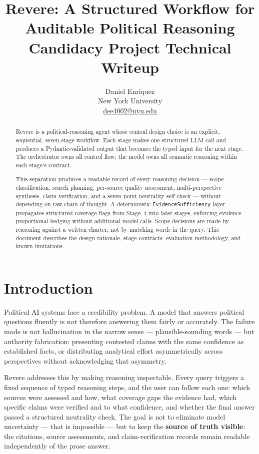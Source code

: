 \documentclass[11pt,letterpaper]{article}
\title{%
  \textbf{Revere: A Structured Workflow for\\[3pt]Auditable Political Reasoning}\\[8pt]
  \large Candidacy Project Technical Writeup
}
\author{Daniel Enriquez\\
  New York University\\
  \href{mailto:dee4002@nyu.edu}{dee4002@nyu.edu}}
\date{\provisional{Draft — June 2026. Candidacy Project Technical Writeup.}}
\newcommand{\kw}[1]{\textbf{#1}}
\newcommand{\code}[1]{\texttt{\small #1}}
\begin{document}
\maketitle

\begin{abstract}
Revere is a political-reasoning agent whose central design choice is an
explicit, sequential, seven-stage workflow. Each stage makes one structured
LLM call and produces a Pydantic-validated output that becomes the typed input
for the next stage. The orchestrator owns all control flow; the model owns all
semantic reasoning within each stage's contract.

This separation produces a readable record of every reasoning decision ---
scope classification, search planning, per-source quality assessment,
multi-perspective synthesis, claim verification, and a seven-point neutrality
self-check --- without depending on raw chain-of-thought. A deterministic
\code{EvidenceSufficiency} layer propagates structured coverage flags from
Stage~4 into later stages, enforcing evidence-proportional hedging without
additional model calls. Scope decisions are made by reasoning against a written
charter, not by matching words in the query. This document describes the design
rationale, stage contracts, evaluation methodology, and known limitations.
\end{abstract}


\section{Introduction}
\label{sec:intro}

Political AI systems face a credibility problem. A model that answers
political questions fluently is not therefore answering them fairly or
accurately. The failure mode is not hallucination in the narrow sense ---
plausible-sounding words --- but authority fabrication: presenting contested
claims with the same confidence as established facts, or distributing
analytical effort asymmetrically across perspectives without acknowledging
that asymmetry.

Revere addresses this by making reasoning inspectable. Every query triggers a
fixed sequence of typed reasoning steps, and the user can follow each one: which
sources were assessed and how, what coverage gaps the evidence had, which
specific claims were verified and to what confidence, and whether the final
answer passed a structured neutrality check. The goal is not to eliminate model
uncertainty --- that is impossible --- but to keep the \kw{source of truth
visible}: the citations, source assessments, and claim-verification records
remain readable independently of the prose answer.
\end{document}
